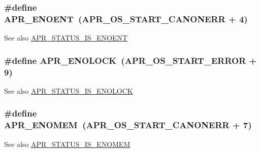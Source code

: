 \subsubsection[{\texorpdfstring{A\+P\+R\+\_\+\+E\+N\+O\+E\+NT}{APR_ENOENT}}]{\setlength{\rightskip}{0pt plus 5cm}\#define A\+P\+R\+\_\+\+E\+N\+O\+E\+NT~({\bf A\+P\+R\+\_\+\+O\+S\+\_\+\+S\+T\+A\+R\+T\+\_\+\+C\+A\+N\+O\+N\+E\+RR} + 4)}\hypertarget{group___a_p_r___error_gacc26a4afe01b6cc141f839be71fddf1c}{}\label{group___a_p_r___error_gacc26a4afe01b6cc141f839be71fddf1c}
\begin{DoxySeeAlso}{See also}
\hyperlink{group___a_p_r___s_t_a_t_u_s___i_s_ga10fdb7568a59b6847ee610f8e5b069f1}{A\+P\+R\+\_\+\+S\+T\+A\+T\+U\+S\+\_\+\+I\+S\+\_\+\+E\+N\+O\+E\+NT} 
\end{DoxySeeAlso}
\subsubsection[{\texorpdfstring{A\+P\+R\+\_\+\+E\+N\+O\+L\+O\+CK}{APR_ENOLOCK}}]{\setlength{\rightskip}{0pt plus 5cm}\#define A\+P\+R\+\_\+\+E\+N\+O\+L\+O\+CK~({\bf A\+P\+R\+\_\+\+O\+S\+\_\+\+S\+T\+A\+R\+T\+\_\+\+E\+R\+R\+OR} + 9)}\hypertarget{group___a_p_r___error_ga9c411624c42f7562a5c6c3461bdcb0ec}{}\label{group___a_p_r___error_ga9c411624c42f7562a5c6c3461bdcb0ec}
\begin{DoxySeeAlso}{See also}
\hyperlink{group___a_p_r___s_t_a_t_u_s___i_s_gac068eb34718b5c632298027136564561}{A\+P\+R\+\_\+\+S\+T\+A\+T\+U\+S\+\_\+\+I\+S\+\_\+\+E\+N\+O\+L\+O\+CK} 
\end{DoxySeeAlso}
\subsubsection[{\texorpdfstring{A\+P\+R\+\_\+\+E\+N\+O\+M\+EM}{APR_ENOMEM}}]{\setlength{\rightskip}{0pt plus 5cm}\#define A\+P\+R\+\_\+\+E\+N\+O\+M\+EM~({\bf A\+P\+R\+\_\+\+O\+S\+\_\+\+S\+T\+A\+R\+T\+\_\+\+C\+A\+N\+O\+N\+E\+RR} + 7)}\hypertarget{group___a_p_r___error_ga6a453e60000000609a95817efabebf4f}{}\label{group___a_p_r___error_ga6a453e60000000609a95817efabebf4f}
\begin{DoxySeeAlso}{See also}
\hyperlink{group___a_p_r___s_t_a_t_u_s___i_s_ga5cc922a3d61d7888f33ac085a7c598fa}{A\+P\+R\+\_\+\+S\+T\+A\+T\+U\+S\+\_\+\+I\+S\+\_\+\+E\+N\+O\+M\+EM} 
\end{DoxySeeAlso}

